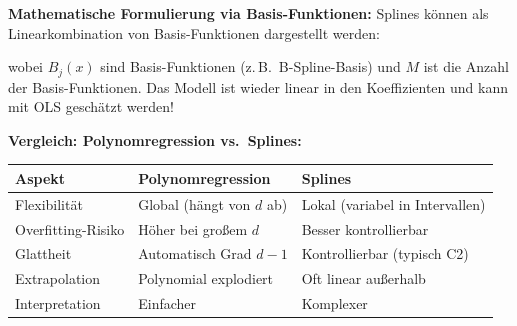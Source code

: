 \textbf{Mathematische Formulierung via Basis-Funktionen:} Splines können als Linearkombination von Basis-Funktionen dargestellt werden:

wobei $B_j(x)$ sind Basis-Funktionen (z.\,B.\ B-Spline-Basis) und $M$ ist die Anzahl der Basis-Funktionen. Das Modell ist wieder linear in den Koeffizienten und kann mit OLS geschätzt werden!

\textbf{Vergleich: Polynomregression vs.\ Splines:}
\begin{table}[h]
    \centering
    \small
    \begin{tabular}{|l|l|l|}
        \hline
        \textbf{Aspekt} & \textbf{Polynomregression} & \textbf{Splines} \\
        \hline
        Flexibilität & Global (hängt von $d$ ab) & Lokal (variabel in Intervallen) \\
        \hline
        Overfitting-Risiko & Höher bei großem $d$ & Besser kontrollierbar \\
        \hline
        Glattheit & Automatisch Grad $d-1$ & Kontrollierbar (typisch C2) \\
        \hline
        Extrapolation & Polynomial explodiert & Oft linear außerhalb \\
        \hline
        Interpretation & Einfacher & Komplexer \\
        \hline
    \end{tabular}
\end{table}


